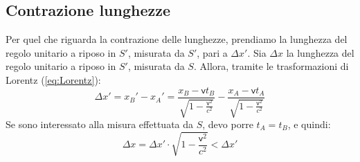 \subsection{Contrazione lunghezze}
%
%
Per quel che riguarda la contrazione delle lunghezze, prendiamo la
 lunghezza del regolo unitario a riposo in $S'$, misurata da $S'$, pari
 a $\Delta x'$. Sia $\Delta x$ la lunghezza del regolo unitario a riposo
 in $S'$, misurata da $S$. Allora, tramite le trasformazioni di Lorentz (\ref{eq:Lorentz}):
\begin{displaymath}
  \Delta
  x'=x_{B}'-x_{A}'= \frac{x_{B} -
    \mathsf{v}t_{B}}{\sqrt{1-\frac{\mathsf{v}^2}{c^2}}} - \frac{x_{A}
    - \mathsf{v}t_{A}}{\sqrt{1-\frac{\mathsf{v}^2}{c^2}}}
\end{displaymath}
Se sono interessato alla misura effettuata da $S$, devo porre
$t_{A}=t_{B}$, e quindi:
\begin{displaymath}
  \Delta x=\Delta x'\cdot\sqrt{1-\frac{\mathsf{v}^2}{c^2}}<\Delta x'
\end{displaymath}
